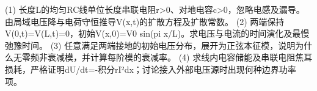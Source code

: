 (1) 长度L的均匀RC线单位长度串联电阻r>0、对地电容c>0，忽略电感及漏导。由局域电压降与电荷守恒推导V(x,t)的扩散方程及扩散常数。
(2) 两端保持V(0,t)=V(L,t)=0，初始V(x,0)=V0 sin(pi x/L)。求电压与电流的时间演化及最慢弛豫时间。
(3) 任意满足两端接地的初始电压分布，展开为正弦本征模，说明为什么无零频非衰减模，并计算每阶模的衰减率。
(4) 求线内电容储能及串联电阻焦耳损耗，严格证明dU/dt=-积分rI²dx；讨论接入外部电压源时出现何种边界功率项。
